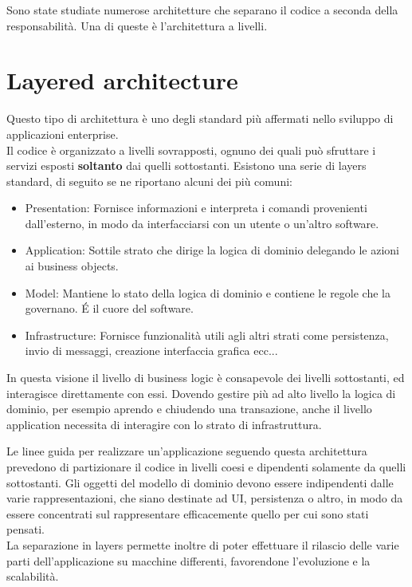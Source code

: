 Sono state studiate numerose architetture che separano il codice a seconda della responsabilità.
Una di queste è l'architettura a livelli.

\section{Layered architecture}

Questo tipo di architettura è uno degli standard più affermati nello sviluppo di applicazioni enterprise.\\
Il codice è organizzato a livelli sovrapposti, ognuno dei quali può sfruttare i servizi esposti \textbf{soltanto} dai quelli sottostanti.
Esistono una serie di layers standard, di seguito se ne riportano alcuni dei più comuni\cite{ddd}:
\begin{itemize}
	\item Presentation: Fornisce informazioni e interpreta i comandi provenienti dall'esterno, in modo da interfacciarsi con un utente o un'altro software.
	\item Application: Sottile strato che dirige la logica di dominio delegando le azioni ai business objects.
	\item Model: Mantiene lo stato della logica di dominio e contiene le regole che la governano. \'E il cuore del software.
	\item Infrastructure: Fornisce funzionalità utili agli altri strati come persistenza, invio di messaggi, creazione interfaccia grafica ecc...
\end{itemize}
In questa visione il livello di business logic è consapevole dei livelli sottostanti, ed interagisce direttamente con essi.
Dovendo gestire più ad alto livello la logica di dominio, per esempio aprendo e chiudendo una transazione, anche il livello application necessita di interagire con lo strato di infrastruttura.

Le linee guida per realizzare un'applicazione seguendo questa architettura prevedono di partizionare il codice in livelli coesi e dipendenti solamente da quelli sottostanti.
Gli oggetti del modello di dominio devono essere indipendenti dalle varie rappresentazioni, che siano destinate ad UI, persistenza o altro, in modo da essere concentrati sul rappresentare efficacemente quello per cui sono stati pensati.\\
La separazione in layers permette inoltre di poter effettuare il rilascio delle varie parti dell'applicazione su macchine differenti, favorendone l'evoluzione e la scalabilità.

